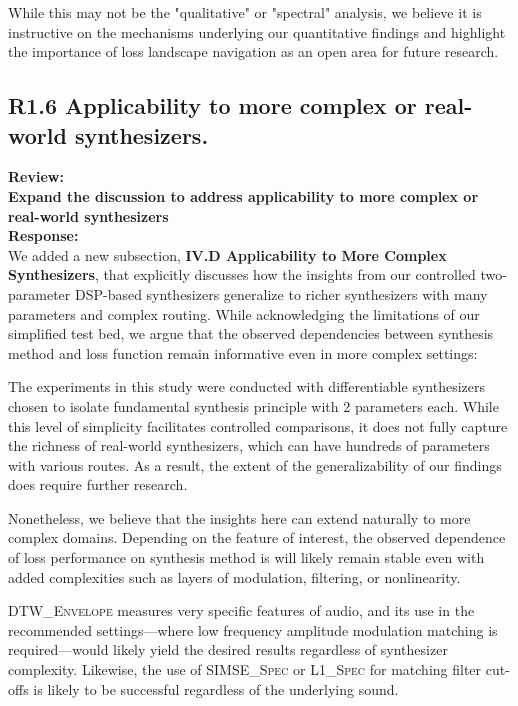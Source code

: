 \documentclass[11pt]{article}
\newcommand{\DTWEnv}{\textsc{DTW\_Envelope}}
\newcommand{\SIMSESpec}{\textsc{SIMSE\_Spec}}
\newcommand{\LoneSpec}{\textsc{L1\_Spec}}
\begin{document}
While this may not be the "qualitative" or "spectral" analysis, we believe it is instructive on the mechanisms underlying our quantitative findings and highlight the importance of loss landscape navigation as an open area for future research.

\subsection*{R1.6 Applicability to more complex or real-world synthesizers.}
\label{R1.6}
\noindent\textbf{Review:} \\
\noindent \textbf{Expand the discussion to address applicability to more complex or real-world synthesizers}
\\

\noindent\textbf{Response:} \\
We added a new subsection, \textbf{IV.D Applicability to More Complex Synthesizers}, that explicitly discusses how the insights from our controlled two-parameter DSP-based synthesizers generalize to richer synthesizers with many parameters and complex routing. While acknowledging the limitations of our simplified test bed, we argue that the observed dependencies between synthesis method and loss function remain informative even in more complex settings:

\begin{displayquote}
    The experiments in this study were conducted with differentiable synthesizers chosen to isolate fundamental synthesis principle with 2 parameters each. While this level of simplicity facilitates controlled comparisons, it does not fully capture the richness of real-world synthesizers, which can have hundreds of parameters with various routes. As a result, the extent of the generalizability of our findings does require further research. 

    Nonetheless, we believe that the insights here can extend naturally to more complex domains. Depending on the feature of interest, the observed dependence of loss performance on synthesis method is will likely remain stable even with added complexities such as layers of modulation, filtering, or nonlinearity. 
    
    \DTWEnv{} measures very specific features of audio, and its use in the recommended settings---where low frequency amplitude modulation matching is required---would likely yield the desired results regardless of synthesizer complexity. Likewise, the use of \SIMSESpec{} or \LoneSpec{} for matching filter cut-offs is likely to be successful regardless of the underlying sound. 
    \end{displayquote}
    
\end{document}
